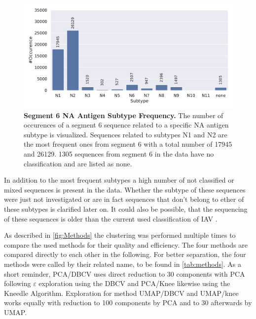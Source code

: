 \begin{figure}[!hbt]
    \centering
    \includegraphics[width=\textwidth]{PCA/Data_Overview_Segment_6_N.pdf}
    \caption[Segment 6 \Acrlong{NA} Antigen Subtype Frequency]{\textbf{Segment 6 \Acrlong{NA} Antigen Subtype Frequency.} The number of occurences of a segment 6 sequence related to a specific \gls{NA} antigen subtype is visualized. Sequences related to subtypes N1 and N2 are the most frequent ones from segment 6 with a total number of 17945 and 26129. 1305 sequences from segment 6 in the data have no classification and are listed as \glqq none\grqq{}.}
    \label{fig:Frequency_6}
\end{figure}

In addition to the most frequent subtypes a high number of not classified or \glqq mixed\grqq{} sequences is present in the data. Whether the subtype of these sequences were just not investigated or are in fact sequences that don't belong to ether of these subtypes is clarified later on. It could also be possible, that the sequencing of these sequences is older than the current used classification of \gls{IAV} \autocite{noauthor_revision_1980}. 

As described in \autoref{fig:Methods} the clustering was performed multiple times to compare the used methods for their quality and efficiency. The four methods are compared directly to each other in the following. For better separation, the four methods were called by their related name, to be found in \autoref{tab:methods}. As a short reminder, \acrshort{PCA}/\acrshort{DBCV} uses direct reduction to 30 components with \gls{PCA} following $\varepsilon$ exploration using the \gls{DBCV} and \acrshort{PCA}/Knee likewise using the Kneedle Algorithm. Exploration for method \acrshort{UMAP}/\acrshort{DBCV} and \acrshort{UMAP}/knee works equally with reduction to 100 components by \gls{PCA} and to 30 afterwards by \gls{UMAP}.   

